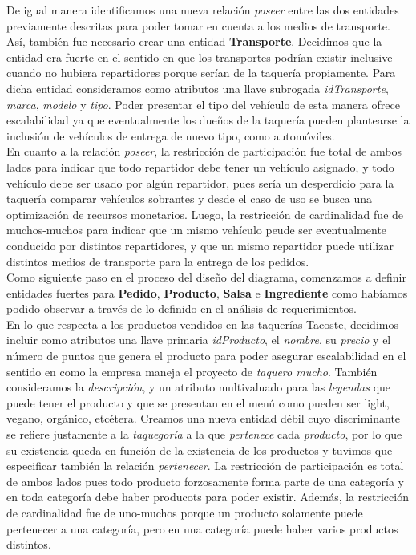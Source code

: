 \documentclass[11pt,letterpaper]{article}
\begin{document}
\newpage 
De igual manera identificamos una nueva relación \textit{poseer} entre las dos entidades previamente descritas para poder tomar en cuenta a los medios de transporte. Así, también fue necesario crear una entidad \textbf{Transporte}. Decidimos que la entidad era fuerte en el sentido en que los transportes podrían existir inclusive cuando no hubiera repartidores porque serían de la taquería propiamente. Para dicha entidad consideramos como atributos una llave subrogada \textit{idTransporte}, \textit{marca}, \textit{modelo} y \textit{tipo}. Poder presentar el tipo del vehículo de esta manera ofrece escalabilidad ya que eventualmente los dueños de la taquería pueden plantearse la inclusión de vehículos de entrega de nuevo tipo, como automóviles. \\

En cuanto a la relación \textit{poseer}, la restricción de participación fue total de ambos lados para indicar que todo repartidor debe tener un vehículo asignado, y todo vehículo debe ser usado por algún repartidor, pues sería un desperdicio para la taquería comparar vehículos sobrantes y desde el caso de uso se busca una optimización de recursos monetarios. Luego, la restricción de cardinalidad fue de muchos-muchos para indicar que un mismo vehículo peude ser eventualmente conducido por distintos repartidores, y que un mismo repartidor puede utilizar distintos medios de transporte para la entrega de los pedidos. \\

Como siguiente paso en el proceso del diseño del diagrama, comenzamos a definir entidades fuertes para \textbf{Pedido}, \textbf{Producto}, \textbf{Salsa} e  \textbf{Ingrediente} como habíamos podido observar a través de lo definido en el análisis de requerimientos. \\

En lo que respecta a los productos vendidos en las taquerías Tacoste, decidimos incluir como atributos una llave primaria \textit{idProducto}, el \textit{nombre}, su \textit{precio} y el número de puntos que genera el producto para poder asegurar escalabilidad en el sentido en como la empresa maneja el proyecto de \textit{taquero mucho}. También consideramos la \textit{descripción}, y un atributo multivaluado para las \textit{leyendas} que puede tener el producto y que se presentan en el menú como pueden ser light, vegano, orgánico, etcétera. Creamos una nueva entidad débil cuyo discriminante se refiere justamente a la \textit{taquegoría} a la que \textit{pertenece} cada \textit{producto}, por lo que su existencia queda en función de la existencia de los productos y tuvimos que especificar también la relación \textit{pertenecer}. La restricción de participación es total de ambos lados pues todo producto forzosamente forma parte de una categoría y en toda categoría debe haber producots para poder existir. Además, la restricción de cardinalidad fue de uno-muchos porque un producto solamente puede pertenecer a una categoría, pero en una categoría puede haber varios productos distintos. \\
\end{document}
